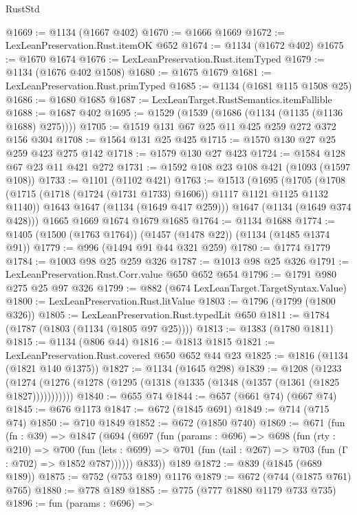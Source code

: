 \begin{lexlean}{RustStd}
\begin{coremodule}
@1669 := @1134 (@1667 @402)
@1670 := @1666 @1669
@1672 := LexLeanPreservation.Rust.itemOK @652
@1674 := @1134 (@1672 @402)
@1675 := @1670 @1674
@1676 := LexLeanPreservation.Rust.itemTyped
@1679 := @1134 (@1676 @402 @1508)
@1680 := @1675 @1679
@1681 := LexLeanPreservation.Rust.primTyped
@1685 := @1134 (@1681 @115 @1508 @25)
@1686 := @1680 @1685
@1687 := LexLeanTarget.RustSemantics.itemFallible
@1688 := @1687 @402
@1695 := @1529 (@1539 (@1686 (@1134 (@1135 (@1136 @1688) @275))))
@1705 := @1519 @131 @67 @25 @11 @425 @259 @272 @372 @156 @304
@1708 := @1564 @131 @25 @425
@1715 := @1570 @130 @27 @25 @259 @423 @275 @142
@1718 := @1579 @130 @27 @423
@1724 := @1584 @128 @67 @23 @11 @421 @272
@1731 := @1592 @108 @23 @108 @421 (@1093 (@1597 @108))
@1733 := @1101 (@1102 @421)
@1763 := @1513
    (@1695
      (@1705
        (@1708 (@1715 (@1718 (@1724 (@1731 @1733) @1606)) @1117 @1121 @1125 @1132 @1140))
        @1643
        @1647
        (@1134 (@1649 @417 @259)))
      @1647
      (@1134 (@1649 @374 @428)))
    @1665
    @1669
    @1674
    @1679
    @1685
@1764 := @1134 @1688
@1774 := @1405 (@1500 (@1763 @1764)) (@1457 (@1478 @22)) (@1134 (@1485 @1374 @91))
@1779 := @996 (@1494 @91 @44 @321 @259)
@1780 := @1774 @1779
@1784 := @1003 @98 @25 @259 @326
@1787 := @1013 @98 @25 @326
@1791 := LexLeanPreservation.Rust.Corr.value @650 @652 @654
@1796 := @1791 @980 @275 @25 @97 @326
@1799 := @882 (@674 LexLeanTarget.TargetSyntax.Value)
@1800 := LexLeanPreservation.Rust.litValue
@1803 := @1796 (@1799 (@1800 @326))
@1805 := LexLeanPreservation.Rust.typedLit @650
@1811 := @1784 (@1787 (@1803 (@1134 (@1805 @97 @25))))
@1813 := @1383 (@1780 @1811)
@1815 := @1134 (@806 @44)
@1816 := @1813 @1815
@1821 := LexLeanPreservation.Rust.covered @650 @652 @44 @23
@1825 := @1816 (@1134 (@1821 @140 @1375))
@1827 := @1134 (@1645 @298)
@1839 := @1208
    (@1233 (@1274 (@1276 (@1278 (@1295 (@1318 (@1335 (@1348 (@1357 (@1361 (@1825 @1827)))))))))))
@1840 := @655 @74
@1844 := @657 (@661 @74) (@667 @74)
@1845 := @676 @1173
@1847 := @672 (@1845 @691)
@1849 := @714 (@715 @74)
@1850 := @710 @1849
@1852 := @672 (@1850 @740)
@1869 := @671
    (fun (fn : @39) =>
    @1847
      (@694
        (@697
          (fun (params : @696) =>
          @698
            (fun (rty : @210) =>
            @700
              (fun (lets : @699) =>
              @701 (fun (tail : @267) => @703 (fun (Γ : @702) => @1852 @787))))))
        @833))
    @189
@1872 := @839 (@1845 (@689 @189))
@1875 := @752 (@753 @189) @1176
@1879 := @672 (@744 (@1875 @761) @765)
@1880 := @778 @189
@1885 := @775 (@777 @1880 @1179 @733 @735)
@1896 := fun (params : @696) =>

\end{coremodule}
\end{lexlean}
